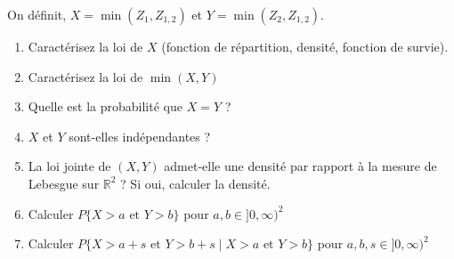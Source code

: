 \documentclass[
  french,
  11pt,
  a4paper,
  twoside,
  article,
  titlepage=false]{memoir}
\providecommand{\tightlist}{%
  \setlength{\itemsep}{0pt}\setlength{\parskip}{0pt}}
\theoremstyle{definition}
\theoremstyle{remark}
\begin{document}
On définit, \(X = \min(Z_1, Z_{1,2})\) et \(Y =  \min(Z_2, Z_{1,2})\).

\protect{}\label{marshall-olkin-ques}
\begin{enumerate}
\def\labelenumi{\arabic{enumi}.}
\tightlist
\item
  Caractérisez la loi de \(X\) (fonction de répartition, densité,
  fonction de survie).
\item
  Caractérisez la loi de \(\min(X, Y)\)
\item
  Quelle est la probabilité que \(X=Y\) ?
\item
  \(X\) et \(Y\) sont-elles indépendantes ?
\item
  La loi jointe de \((X, Y)\) admet-elle une densité par rapport à la
  mesure de Lebesgue sur \(\mathbb{R}^2\) ? Si oui, calculer la densité.
\item
  Calculer \(P\{ X > a \text{ et } Y > b\}\) pour
  \(a, b ∈ ]0,\infty)^2\)
\item
  Calculer
  \(P\{ X > a + s \text{ et } Y > b +s \mid X >a \text{ et } Y>b\}\)
  pour \(a, b, s ∈ ]0,\infty)^2\)
\end{enumerate}


\backmatter
\end{document}
